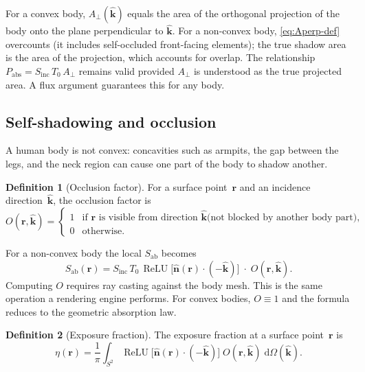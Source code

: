 \documentclass[11pt,a4paper]{article}
\theoremstyle{definition}      %
\newtheorem{definition}[definition]{Definition}
\newcommand{\khat}{\hat{\bm{k}}}
\newcommand{\nhat}{\hat{\bm{n}}}
\newcommand{\rr}{\mathbf{r}}
\newcommand{\Sinc}{S_{\mathrm{inc}}}
\newcommand{\Sab}{S_{\mathrm{ab}}}
\newcommand{\Aperp}{A_{\perp}}
\DeclareMathOperator{\ReLU}{ReLU}
\newcommand{\diff}{\mathrm{d}}        %
\begin{document}
For a convex body, $\Aperp(\khat)$ equals the area of the orthogonal
projection of the body onto the plane perpendicular to $\khat$.  For a
non-convex body, \cref{eq:Aperp-def} overcounts (it includes
self-occluded front-facing elements); the true shadow area is the area
of the projection, which accounts for overlap.  The relationship
$P_{\mathrm{abs}}=\Sinc\,T_0\,\Aperp$ remains valid provided
$\Aperp$ is understood as the true projected area. A flux argument
guarantees this for any body.

\subsection{Self-shadowing and occlusion}\label{sec:self-shadow}

A human body is not convex: concavities such as armpits, the gap
between the legs, and the neck region can cause one part of the body to
shadow another.

\begin{definition}[Occlusion factor]
For a surface point~$\rr$ and an incidence direction~$\khat$, the
occlusion factor is
\begin{equation}\label{eq:O-def}
  O(\rr,\khat) = \begin{cases}
    1 & \text{if $\rr$ is visible from direction $\khat$
          (not blocked by another body part),}\\
    0 & \text{otherwise.}
  \end{cases}
\end{equation}
\end{definition}

For a non-convex body the local $\Sab$ becomes
\begin{equation}\label{eq:Sab-occluded}
  \Sab(\rr) = \Sinc\,T_0\,\ReLU\!\bigl[\nhat(\rr)\cdot(-\khat)\bigr]
  \;\cdot\; O(\rr,\khat).
\end{equation}
Computing $O$ requires ray casting against the body mesh. This is the
same operation a rendering engine performs. For convex bodies,
$O\equiv 1$ and the formula reduces to the geometric absorption law.

\begin{definition}[Exposure fraction]\label{def:eta}
The exposure fraction at a surface point~$\rr$ is
\begin{equation}\label{eq:eta-def}
  \eta(\rr) = \frac{1}{\pi}\int_{S^2}
  \ReLU\!\bigl[\nhat(\rr)\cdot(-\khat)\bigr]\;O(\rr,\khat)\;\diff \Omega(\khat).
\end{equation}
\end{definition}
\end{document}
